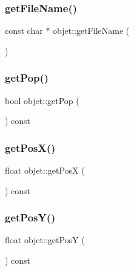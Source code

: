 \mbox{\label{classobjet_aec4890842e14442a09a46a127cda95e3}} 
\subsubsection{\texorpdfstring{get\+File\+Name()}{getFileName()}}
{\footnotesize\ttfamily const char $\ast$ objet\+::get\+File\+Name (\begin{DoxyParamCaption}{ }\end{DoxyParamCaption})}

\mbox{\label{classobjet_a35cc4308dbe35d4897b2cdf93e5eeb58}} 
\subsubsection{\texorpdfstring{get\+Pop()}{getPop()}}
{\footnotesize\ttfamily bool objet\+::get\+Pop (\begin{DoxyParamCaption}{ }\end{DoxyParamCaption}) const}

\mbox{\label{classobjet_a14d6cb0ecc385f5a374aef05221169fc}} 
\subsubsection{\texorpdfstring{get\+Pos\+X()}{getPosX()}}
{\footnotesize\ttfamily float objet\+::get\+PosX (\begin{DoxyParamCaption}{ }\end{DoxyParamCaption}) const}

\mbox{\label{classobjet_a7a485e9e878a0ed1cd5b1b90f2cd89df}} 
\subsubsection{\texorpdfstring{get\+Pos\+Y()}{getPosY()}}
{\footnotesize\ttfamily float objet\+::get\+PosY (\begin{DoxyParamCaption}{ }\end{DoxyParamCaption}) const}

